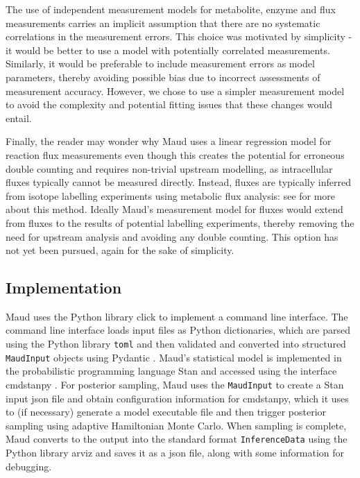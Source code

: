 \documentclass[journal=asbcd6,manuscript=article,layout=traditional]{achemso}
\begin{document}
The use of independent measurement models for metabolite, enzyme and
flux measurements carries an implicit assumption that there are no
systematic correlations in the measurement errors. This choice was
motivated by simplicity - it would be better to use a model with
potentially correlated measurements. Similarly, it would be preferable
to include measurement errors as model parameters, thereby avoiding
possible bias due to incorrect assessments of measurement accuracy.
However, we chose to use a simpler measurement model to avoid the
complexity and potential fitting issues that these changes would entail.

Finally, the reader may wonder why Maud uses a linear regression model
for reaction flux measurements even though this creates the potential
for erroneous double counting and requires non-trivial upstream
modelling, as intracellular fluxes typically cannot be measured
directly. Instead, fluxes are typically inferred from isotope labelling
experiments using metabolic flux analysis: see
\citet{daiUnderstandingMetabolismFlux2017} for more about this method.
Ideally Maud's measurement model for fluxes would extend from fluxes to
the results of potential labelling experiments, thereby removing the
need for upstream analysis and avoiding any double counting. This option
has not yet been pursued, again for the sake of simplicity.

\hypertarget{implementation}{%
\subsection{Implementation}\label{implementation}}

Maud uses the Python library click
\citep{clickdevelopersClickPythonComposable2022} to implement a command
line interface. The command line interface loads input files as Python
dictionaries, which are parsed using the Python library \texttt{toml}
\citep{pearsonTomlPythonLibrary2020} and then validated and converted
into structured \texttt{MaudInput} objects using Pydantic
\citep{pydanticdevelopersPydantic2022}. Maud's statistical model is
implemented in the probabilistic programming language Stan
\citep{carpenterStanProbabilisticProgramming2017} and accessed using the
interface cmdstanpy \citep{standevelopmentteamCmdStanPy2022}. For
posterior sampling, Maud uses the \texttt{MaudInput} to create a Stan
input json file and obtain configuration information for cmdstanpy,
which it uses to (if necessary) generate a model executable file and
then trigger posterior sampling using adaptive Hamiltonian Monte Carlo.
When sampling is complete, Maud converts to the output into the standard
format \texttt{InferenceData} using the Python library arviz
\citep{kumarArviZUnifiedLibrary2019} and saves it as a json file, along
with some information for debugging.
\end{document}
